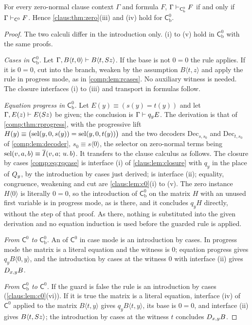 \begin{theorem}
\label{claus:thm:fixedzero}
For every zero-normal clause context $\Gamma$ and formula $F$,
$\Gamma\vdash_{\mathsf{C}^{0}_{\mathrm{b}}}F$ if and only if
$\Gamma\vdash_{\mathsf{C}^{0}}F$. Hence \cref{claus:thm:zero}(iii) and
(iv) hold for $\mathsf{C}^{0}_{\mathrm{b}}$.
\end{theorem}
\begin{proof}
The two calculi differ in the introduction only. (i) to
(v) hold in $\mathsf{C}^{0}_{\mathrm{b}}$ with the same proofs.

\emph{Cases in $\mathsf{C}^{0}_{\mathrm{b}}$.} Let
$\Gamma,B\langle t,0\rangle\vdash B\langle t,S z\rangle$. If the base
is not $0=0$ the rule applies. If it is $0=0$, cut  into
the branch, weaken by the assumption $B\langle t,z\rangle$ and apply the
rule in progress mode, as in \cref{comp:lem:rcases}. No auxiliary witness
is needed. The closure
interfaces (i) to (iii) and transport in formulas follow.

\emph{Equation progress in $\mathsf{C}^{0}_{\mathrm{b}}$.} Let
$E(y)\equiv(s(y)=t(y))$ and let $\Gamma,E(z)\vdash E(S z)$ be given;
the conclusion is $\Gamma\vdash q_yE$. The derivation is that of
\cref{comp:thm:rprogress}, with the progressive lift
$H(y)\equiv\bigl(\operatorname{sel}(y,0,s(y))=\operatorname{sel}(y,0,t(y))\bigr)$ and the two
decoders $\mathrm{Dec}_{s,s_0}$ and $\mathrm{Dec}_{t,s_0}$ of
\cref{comp:lem:decoder}, $s_0\equiv s\langle 0\rangle$, the selector on
zero-normal terms being $\operatorname{sel}(v,a,b)\equiv\overline{I}(v,a;\,u.\,b)$. It
transfers to the clause calculus as follows. The closure by cases
\eqref{comp:eq:rqcase} is interface (i) of \cref{claus:lem:closure} with
$q_y$ in the place of $Q_{y}$, by the introduction by cases just derived;
 is interface (ii); equality, congruence, weakening and cut
are \cref{claus:lem:c0}(i) to (v). The zero instance $H\langle 0\rangle$
is literally $0=0$, so the introduction of $\mathsf{C}^{0}_{\mathrm{b}}$ on
the matrix $H$ with an unused first variable is in progress mode, as
 is there, and it concludes $q_yH$ directly, without the
 step of that proof. As there, nothing is substituted into
the given derivation and no equation induction is used before the guarded
rule is applied.

\emph{From $\mathsf{C}^{0}$ to $\mathsf{C}^{0}_{\mathrm{b}}$.} An
 of $\mathsf{C}^{0}$ in case mode is an introduction by
cases. In progress mode the matrix is a literal equation and the witness
is $0$; equation progress gives $q_yB\langle 0,y\rangle$, and the
introduction by cases at the witness $0$ with interface (ii) gives
$D_{x,y}B$.

\emph{From $\mathsf{C}^{0}_{\mathrm{b}}$ to $\mathsf{C}^{0}$.} If the
guard is false the rule is an introduction by cases
(\cref{claus:lem:c0}(vi)). If it is true the matrix is a literal equation,
interface (iv) of $\mathsf{C}^{0}$ applied to the matrix
$B\langle t,y\rangle$ gives $q_yB\langle t,y\rangle$, its base is $0=0$,
and interface (ii) gives $B\langle t,S z\rangle$; the introduction by
cases at the witness $t$ concludes $D_{x,y}B$.
\end{proof}

